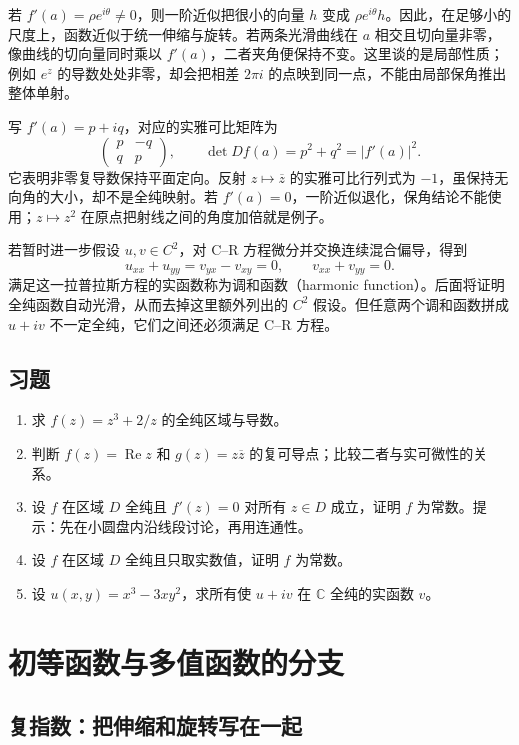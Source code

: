 \documentclass[UTF8,12pt,a4paper,fontset=fandol]{ctexbook}
\begin{document}
若 $f'(a)=\rho e^{i\theta}\ne0$，则一阶近似把很小的向量 $h$ 变成 $\rho e^{i\theta}h$。因此，在足够小的尺度上，函数近似于统一伸缩与旋转。若两条光滑曲线在 $a$ 相交且切向量非零，像曲线的切向量同时乘以 $f'(a)$，二者夹角便保持不变。这里谈的是局部性质；例如 $e^z$ 的导数处处非零，却会把相差 $2\pi i$ 的点映到同一点，不能由局部保角推出整体单射。

写 $f'(a)=p+iq$，对应的实雅可比矩阵为
\[
 \begin{pmatrix}p&-q\\q&p\end{pmatrix},\qquad
 \det Df(a)=p^2+q^2=|f'(a)|^2.
\]
它表明非零复导数保持平面定向。反射 $z\mapsto\overline z$ 的实雅可比行列式为 $-1$，虽保持无向角的大小，却不是全纯映射。若 $f'(a)=0$，一阶近似退化，保角结论不能使用；$z\mapsto z^2$ 在原点把射线之间的角度加倍就是例子。

若暂时进一步假设 $u,v\in C^2$，对 C--R 方程微分并交换连续混合偏导，得到
\[
 u_{xx}+u_{yy}=v_{yx}-v_{xy}=0,\qquad
 v_{xx}+v_{yy}=0.
\]
满足这一拉普拉斯方程的实函数称为调和函数（harmonic function）。后面将证明全纯函数自动光滑，从而去掉这里额外列出的 $C^2$ 假设。但任意两个调和函数拼成 $u+iv$ 不一定全纯，它们之间还必须满足 C--R 方程。

\section{习题}
\label{sec:cv-derivative-ex}
\begin{enumerate}
 \item 求 $f(z)=z^3+2/z$ 的全纯区域与导数。
 \item 判断 $f(z)=\operatorname{Re}z$ 和 $g(z)=z\overline z$ 的复可导点；比较二者与实可微性的关系。
 \item 设 $f$ 在区域 $D$ 全纯且 $f'(z)=0$ 对所有 $z\in D$ 成立，证明 $f$ 为常数。提示：先在小圆盘内沿线段讨论，再用连通性。
 \item 设 $f$ 在区域 $D$ 全纯且只取实数值，证明 $f$ 为常数。
 \item 设 $u(x,y)=x^3-3xy^2$，求所有使 $u+iv$ 在 $\mathbb C$ 全纯的实函数 $v$。
\end{enumerate}

\chapter{初等函数与多值函数的分支}
\label{chap:cv-elementary}

\section{复指数：把伸缩和旋转写在一起}
\end{document}

